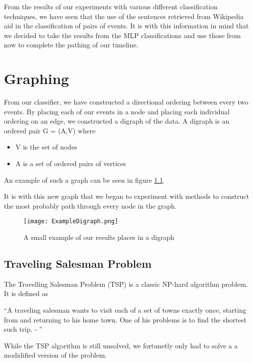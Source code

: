 \documentclass[bsc,frontabs,twoside,singlespacing,parskip,deptreport]{infthesis}     %
\begin{document}
From the results of our experiments with various different classification techniques, we have seen that the use of the sentences retrieved
from Wikipedia aid in the classification of pairs of events. It is with this information in mind that we decided to take the results from
the MLP classifications and use those from now to complete the pathing of our timeline.

\chapter{Graphing}
From our classifier, we have constructed a directional ordering between every two events.
By placing each of our events in a node and placing each individual ordering on an edge, we constructed
a digraph of the data.
A digraph is an ordered pair G = (A,V) where\cite{bang2008digraphs}
\begin{itemize}
  \item V is the set of nodes
  \item A is a set of ordered pairs of vertices
\end{itemize}
An example of such a graph can be seen in figure \ref{fig:digraph}.

It is with this new graph that we began to experiment with methods to construct the most probably path through every
node in the graph.


\begin{figure}
  \centering
  \texttt{[image: ExampleDigraph.png]}
  \caption{A small example of our results places in a digraph}
  \label{fig:digraph}
 \end{figure}

\section{Traveling Salesman Problem}
The Travelling Salesman Problem (TSP) is a classic NP-hard algorithm problem\cite{junger1995traveling}.%
It is defined as
\begin{center}
\enquote{A traveling salesman wants to visit each of a set of towns exactly once, starting
from and returning to his home town. One of his problems is to find the shortest
such trip. - \cite{junger1995traveling}}
\end{center}

While the TSP algorithm is still unsolved, we fortunetly only had to solve a a modidified version of the problem.\\
\end{document}
